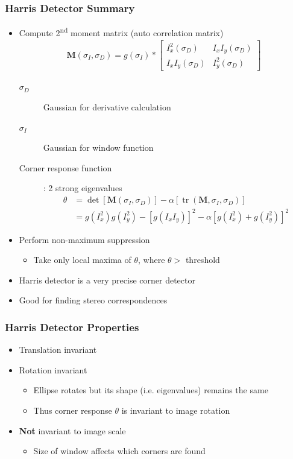 \documentclass[letterpaper,12pt]{article}
\newcommand{\matr}[1]{\mathbf{#1}}
\DeclareMathOperator{\tr}{tr}
\begin{document}
\subsubsection{Harris Detector Summary}
\begin{itemize}
 \item Compute 2\textsuperscript{nd} moment matrix (auto correlation matrix)
       \begin{align}
        \matr{M}(\sigma_I,\sigma_D) = g(\sigma_I) *
        \begin{bmatrix}
         I^2_x(\sigma_D)   & I_x I_y(\sigma_D) \\
         I_x I_y(\sigma_D) & I^2_y(\sigma_D)
        \end{bmatrix}
       \end{align}
       \begin{description}
        \item[$\sigma_D$] Gaussian for derivative calculation
        \item[$\sigma_I$] Gaussian for window function
        \item[Corner response function]: 2 strong eigenvalues
              \begin{align}
               \theta & = \det[\matr{M}(\sigma_I, \sigma_D)] - \alpha[\tr(\matr{M},\sigma_I,\sigma_D)] \\
                      & = g(I_x^2)g(I_y^2) - [g(I_x I_y)]^2 - \alpha[g(I_x^2) + g(I_y^2)]^2
              \end{align}
       \end{description}
 \item Perform non-maximum suppression
       \begin{itemize}
        \item Take only local maxima of $\theta$, where $\theta >$ threshold
       \end{itemize}
 \item Harris detector is a very precise corner detector
 \item Good for finding stereo correspondences
\end{itemize}

\subsubsection{Harris Detector Properties}
\begin{itemize}
 \item Translation invariant
 \item Rotation invariant
       \begin{itemize}
        \item Ellipse rotates but its shape (i.e. eigenvalues) remains the same
        \item Thus corner response $\theta$ is invariant to image rotation
       \end{itemize}
 \item \textbf{Not}  invariant to image scale
       \begin{itemize}
        \item Size of window affects which corners are found
       \end{itemize}
\end{itemize}
\end{document}
